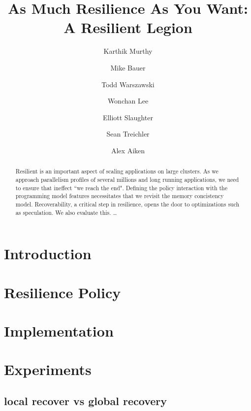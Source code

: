 \documentclass{llncs}
\begin{document}
\mainmatter              %
%
\title{As Much Resilience As You Want: \\A Resilient Legion}
%
 
\author{Karthik Murthy \and
Mike Bauer \and 
Todd Warszawski\and 
Wonchan Lee \and
Elliott Slaughter \and
Sean Treichler \and
Alex Aiken
}
%

\maketitle              %

\begin{abstract} 
Resilient is an important aspect of scaling applications on
large clusters. As we approach parallelism profiles of several millions and long running applications, we need to ensure that ineffect ``we reach the end".
Defining the policy interaction with the programming model features necessitates that we revisit the memory concistency model. 
Recoverability, a critical step in
resilience, opens the door to optimizations such as speculation. We also
evaluate this.  \dots
{}
\end{abstract}

%
\section{Introduction}

\section{Resilience Policy}





\section{Implementation}

\section{Experiments}

\subsection{local recover vs global recovery}
\end{document}
